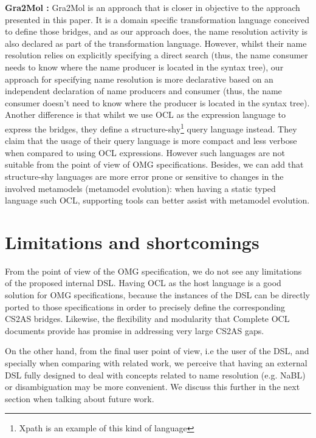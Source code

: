 \documentclass{llncs}
\begin{document}
\textbf{Gra2Mol \cite{canovas2012gra2mol}:}  Gra2Mol is an approach that is closer in objective to the approach presented in this paper. It is a domain specific transformation language conceived to define those bridges, and as our approach does, the name resolution activity is also declared as part of the transformation language. However, whilst their name resolution relies on explicitly specifying a direct search (thus, the name consumer needs to know where the name producer is located in the syntax tree), our approach for specifying name resolution is more declarative based on an independent declaration of name producers and consumer (thus, the name consumer doesn't need to know where the producer is located in the syntax tree). Another difference is that whilst we use OCL as the expression language to express the bridges, they define a structure-shy\footnote{Xpath is an example of this kind of language} query language instead. They claim that the usage of their query language is more compact and less verbose when compared to using OCL expressions. However such languages are not suitable from the point of view of OMG specifications. Besides, we can add that structure-shy languages are more error prone or sensitive to changes in the involved metamodels (metamodel evolution): when having a static typed language such OCL, supporting tools can better assist with metamodel evolution.

\section{Limitations and shortcomings}
\label{sec:limitations}

From the point of view of the OMG specification, we do not see any limitations of the proposed internal DSL. Having OCL as the host language is a good solution for OMG specifications, because the instances of the DSL can be directly ported to those specifications in order to precisely define the corresponding CS2AS bridges. Likewise, the flexibility and modularity that Complete OCL documents provide has promise in addressing very large CS2AS gaps.

On the other hand, from the final user point of view, i.e the user of the DSL, and specially when comparing with related work, we perceive that having an external DSL fully designed to deal with concepts related to name resolution (e.g. NaBL) or disambiguation may be more convenient. We discuss this further in the next section when talking about future work.
\end{document}
